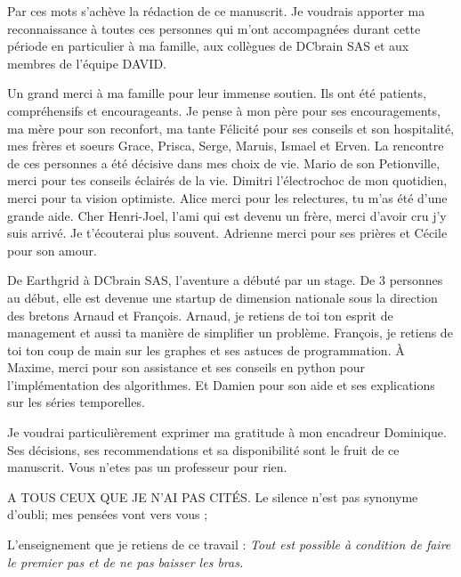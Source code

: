 

Par ces mots s'ach\`eve la r\'edaction de ce manuscrit.
Je voudrais apporter ma reconnaissance \`a toutes ces personnes qui m'ont accompagn\'ees durant cette p\'eriode en particulier \`a ma famille, aux coll\`egues de DCbrain SAS et aux membres de l'\'equipe DAVID.
\newline 

Un grand merci \`a ma famille pour leur immense soutien. Ils ont \'et\'e patients, compr\'ehensifs et encourageants. Je pense \`a mon p\`ere pour ses encouragements, ma m\`ere pour son reconfort, ma tante F\'elicit\'e pour ses conseils et son hospitalit\'e, mes fr\`eres et soeurs Grace, Prisca, Serge, Maruis, Ismael et Erven. 
\newline
La rencontre de ces personnes a \'et\'e d\'ecisive dans mes choix de vie. 
Mario de son Petionville, merci pour tes conseils \'eclair\'es de la vie.
Dimitri l'\'electrochoc de mon quotidien, merci pour ta vision optimiste. 
Alice merci pour les relectures, tu m'as \'et\'e d'une grande aide.
Cher Henri-Joel, l'ami qui est devenu un fr\`ere, merci d'avoir cru j'y suis arriv\'e. Je t'\'ecouterai plus souvent.   
Adrienne merci pour ses pri\`eres et C\'ecile pour son amour.
\newline

De Earthgrid \`a DCbrain SAS, l'aventure a d\'ebut\'e par un stage. De $3$ personnes au d\'ebut, elle est devenue une startup de dimension nationale sous la direction des bretons Arnaud et Fran{\c c}ois. 
Arnaud, je retiens de toi ton esprit de management et aussi ta mani\`ere de simplifier un probl\`eme.
Fran{\c c}ois, je retiens  de toi ton  coup de main sur les graphes et ses astuces de programmation.
\`A Maxime, merci pour son assistance et ses conseils en python pour l'impl\'ementation des algorithmes.
Et Damien pour son aide et ses explications sur les s\'eries temporelles.
\newline

Je voudrai particuli\`erement exprimer ma gratitude \`a  mon encadreur Dominique. Ses d\'ecisions, ses recommendations et sa disponibilit\'e sont le fruit de ce manuscrit. 
Vous n'etes pas un professeur pour rien.
\newline

A TOUS CEUX QUE JE N'AI PAS CIT\'ES.
Le silence n'est pas synonyme d'oubli; mes pens\'ees vont vers vous ;
\newline

L'enseignement que je retiens de ce travail : \newline
{\em Tout est possible \`a condition de faire le premier pas et de ne pas baisser les bras.}
